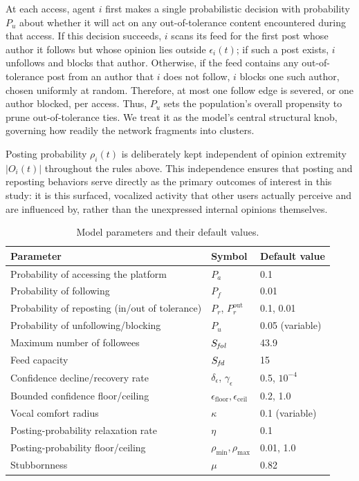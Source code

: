 \documentclass{svproc}
\def\Blue{\color[rgb]{0,0,1}}
\def\Black{\color[rgb]{0,0,0}}
\def\post{\rho}                 %
\def\BoundedConfidence{\epsilon} %
\def\Stubbornness{\mu}           %
\def\maxfollower{S_{\it fol}}    %
\def\maxfeed{S_{\it fd}}         %
\def\VCR{\kappa}                 %
\begin{document}
At each access, agent $i$ first makes a single probabilistic decision
with probability $P_u$ about whether it will act on any
out-of-tolerance content encountered during that access. If this
decision succeeds, $i$ scans its feed for the first post whose author
it follows but whose opinion lies outside $\BoundedConfidence_i(t)$;
if such a post exists, $i$ unfollows and blocks that
author. Otherwise, if the feed contains any out-of-tolerance post from
an author that $i$ does not follow, $i$ blocks one such author, chosen
uniformly at random. Therefore, at most one follow edge is severed, or
one author blocked, per access. Thus, $P_u$ sets the population's
overall propensity to prune out-of-tolerance ties. We treat it as the
model's central structural knob, governing how readily the network
fragments into clusters.
\par

Posting probability $\post_i(t)$ is deliberately kept independent of
opinion extremity $\vert O_i(t)\vert$ throughout the rules
above. This independence ensures that posting and reposting behaviors
serve directly as the primary outcomes of interest in this study: it
is this surfaced, vocalized activity that other users actually
perceive and are influenced by, rather than the unexpressed internal
opinions themselves.
\par


\begin{table}[t]\Blue
\centering
\caption{Model parameters and their default values.}\label{tab:param}
\tabcolsep=5pt
\begin{tabular}{lll}
\toprule
Parameter & Symbol & Default value \\
\midrule
Probability of accessing the platform & $P_a$ & 0.1 \\
Probability of following & $P_f$ & 0.01 \\
Probability of reposting (in/out of tolerance) & $P_r$, $P_r^{\text{out}}$ & 0.1, 0.01 \\
Probability of unfollowing/blocking & $P_u$ & 0.05 (variable) \\
Maximum number of followees & $\maxfollower$ & 43.9 \\
Feed capacity & $\maxfeed$ & 15 \\
Confidence decline/recovery rate & $\delta_{\BoundedConfidence}$, $\gamma_{\BoundedConfidence}$ & 0.5, $10^{-4}$ \\
Bounded confidence floor/ceiling & $\BoundedConfidence_{\mathrm{floor}},\BoundedConfidence_{\mathrm{ceil}}$ & 0.2, 1.0 \\
Vocal comfort radius & $\VCR$ & 0.1 (variable) \\
Posting-probability relaxation rate & $\eta$ & 0.1 \\
Posting-probability floor/ceiling & $\post_{\min},\post_{\max}$ & 0.01, 1.0 \\
Stubbornness & $\Stubbornness$ & 0.82 \\
\bottomrule
\end{tabular}\Black
\end{table}
\end{document}
